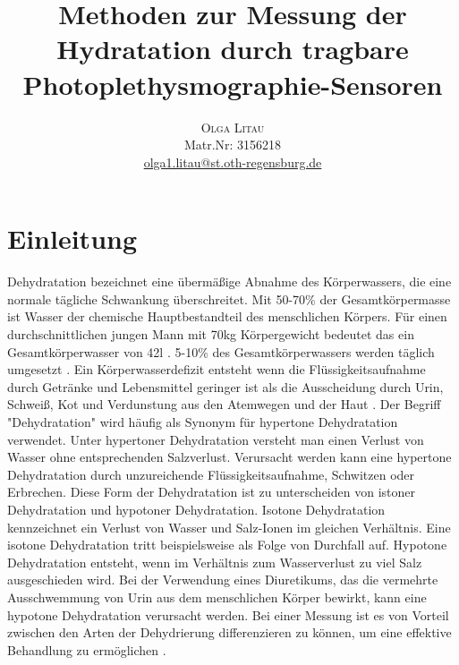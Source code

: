 \documentclass[10pt,a4paper,headinclude,twoside, plainheadsepline, open=right, numbers=noenddot, twocolumn]{article}
\title{\vspace{-5mm}%
	\fontsize{20pt}{10pt}\selectfont
	\textbf{Methoden zur Messung der Hydratation durch tragbare Photoplethysmographie-Sensoren}
	}
\author{
	\large
       \begin{minipage}[t]{0.33\linewidth}
         \begin{center}
           	\textsc{Olga Litau}\\[2mm]
                 \normalsize	Matr.Nr: 3156218\\
                 \normalsize
                 \href{mailto:olga1.litau@st.oth-regensburg.de}
                 {olga1.litau@st.oth-regensburg.de}      
         \end{center}
       \end{minipage}        
     }
\begin{document}


\section{Einleitung}
\label{einleitung}
Dehydratation bezeichnet eine übermäßige Abnahme des Körperwassers, die eine normale tägliche Schwankung überschreitet. 
Mit 50-70\% der Gesamtkörpermasse ist Wasser der chemische Hauptbestandteil des menschlichen Körpers.
Für einen durchschnittlichen jungen Mann mit 70kg Körpergewicht bedeutet das ein Gesamtkörperwasser von 42l \cite{sawka2015hypohydration}.
5-10\% des Gesamtkörperwassers werden täglich umgesetzt \cite{raman2004american}.
Ein Körperwasserdefizit entsteht wenn die Flüssigkeitsaufnahme durch Getränke und Lebensmittel geringer ist als die Ausscheidung durch Urin, Schweiß, Kot und Verdunstung aus den Atemwegen und der Haut \cite{garret2018engineering}.
Der Begriff "Dehydratation" wird häufig als Synonym für hypertone Dehydratation verwendet.
Unter hypertoner Dehydratation versteht man einen Verlust von Wasser ohne entsprechenden Salzverlust. 
Verursacht werden kann eine hypertone Dehydratation durch unzureichende Flüssigkeitsaufnahme, Schwitzen oder Erbrechen.
Diese Form der Dehydratation ist zu unterscheiden von istoner Dehydratation und hypotoner Dehydratation.
Isotone Dehydratation kennzeichnet ein Verlust von Wasser und Salz-Ionen im gleichen Verhältnis.
Eine isotone Dehydratation tritt beispielsweise als Folge von Durchfall auf.
Hypotone Dehydratation entsteht, wenn im Verhältnis zum Wasserverlust zu viel Salz ausgeschieden wird.
Bei der Verwendung eines Diuretikums, das die vermehrte Ausschwemmung von Urin aus dem menschlichen Körper bewirkt, kann eine hypotone Dehydratation verursacht werden. 
Bei einer Messung ist es von Vorteil zwischen den Arten der Dehydrierung differenzieren zu können, um eine effektive Behandlung zu ermöglichen \cite{garret2018engineering}.
\end{document}
